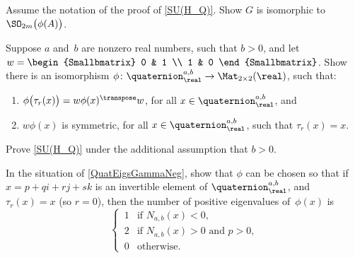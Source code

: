 \begin{exercises}
\item \label{SUQuatisSO}
Assume the notation of the proof of \cref{SU(H_Q)}. Show $G$ is isomorphic to $\SO_{2m}\bigl( \phi(A) \bigr)$.

\item \label{QuatEigsGammaPos}
 Suppose $a$ and~$b$ are nonzero real numbers,
such that $b > 0$, and let
 $ w = 
 \begin{Smallbmatrix}
 0 & 1 \\ 1 & 0 
 \end{Smallbmatrix}
 $.
 Show there is
an isomorphism $\phi \colon \quaternion^{a,b}_\real \to
\Mat_{2 \times 2}(\real)$, such that:
 \begin{enumerate}
 \item $\phi \bigl( \tau_r(x) \bigr) = w
\phi(x)^\transpose w$, for all $x \in
\quaternion^{a,b}_\real$,
and
 \item $w \phi(x)$ is symmetric, for all $x \in
\quaternion^{a,b}_\real$, such that $\tau_r(x) = x$.
 \end{enumerate}

\item \label{SU(H_Q)PfbPos}
Prove \cref{SU(H_Q)} under the additional assumption that $b > 0$.

\item \label{CountQuatEigsGammaNeg}
In the situation of \cref{QuatEigsGammaNeg}, show that $\phi$ can be chosen so that if $x = p + qi + rj +  sk$ is an invertible element of
$\quaternion^{a,b}_\real$, and $\tau_r(x) = x$ (so $r = 0$), then
the number of positive eigenvalues of~$\phi(x)$ is
 $$ \begin{cases}
 \,1 & \mbox{if $N_{a,b}(x) < 0$,} \\
 \,2 & \mbox{if $N_{a,b}(x) > 0$ and $p > 0$,} \\
\, 0 & \mbox{otherwise} 
 . \end{cases}
 $$


\end{exercises}
